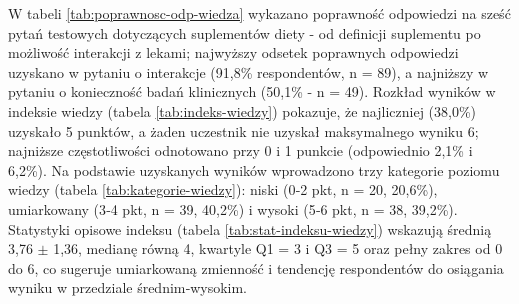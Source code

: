 
W tabeli \ref{tab:poprawnosc-odp-wiedza} wykazano poprawność odpowiedzi na sześć pytań testowych dotyczących suplementów diety - od definicji suplementu po możliwość interakcji z lekami; najwyższy odsetek poprawnych odpowiedzi uzyskano w pytaniu o interakcje (91,8\% respondentów, n = 89), a najniższy w pytaniu o konieczność badań klinicznych (50,1\% - n = 49). Rozkład wyników w indeksie wiedzy (tabela \ref{tab:indeks-wiedzy}) pokazuje, że najliczniej (38,0\%) uzyskało 5 punktów, a żaden uczestnik nie uzyskał maksymalnego wyniku 6; najniższe częstotliwości odnotowano przy 0 i 1 punkcie (odpowiednio 2,1\% i 6,2\%). Na podstawie uzyskanych wyników wprowadzono trzy kategorie poziomu wiedzy (tabela \ref{tab:kategorie-wiedzy}): niski (0‐2 pkt, n = 20, 20,6\%), umiarkowany (3‐4 pkt, n = 39, 40,2\%) i wysoki (5‐6 pkt, n = 38, 39,2\%). Statystyki opisowe indeksu (tabela \ref{tab:stat-indeksu-wiedzy}) wskazują średnią 3,76 $\pm$ 1,36, medianę równą 4, kwartyle Q1 = 3 i Q3 = 5 oraz pełny zakres od 0 do 6, co sugeruje umiarkowaną zmienność i tendencję respondentów do osiągania wyniku w przedziale średnim‐wysokim.



